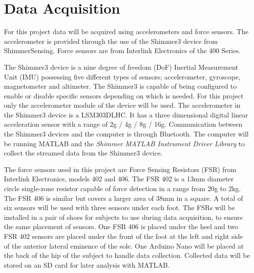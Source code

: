 \section{Data Acquisition}

For this project data will be acquired using accelerometers and force sensors. The accelerometer is provided through the use of the Shimmer3 device from ShimmerSensing. Force sensors are from Interlink Electronics of the 400 Series. %

The Shimmer3 device is a nine degree of freedom (DoF) Inertial Measurement Unit (IMU) possessing five different types of sensors; accelerometer, gyroscope, magnetometer and altimeter. The Shimmer3 is capable of being configured to enable or disable specific sensors depending on which is needed. For this project only the accelerometer module of the device will be used. The accelerometer in the Shimmer3 device is a LSM303DLHC. It has a three dimensional digital linear acceleration sensor with a range of \pm2g / \pm4g / \pm8g / \pm16g. \cite{LSM303DLHC} %
Communication between the Shimmer3 devices and the computer is through Bluetooth. The computer will be running MATLAB and the \textit{Shimmer MATLAB Instrument Driver Library} to collect the streamed data from the Shimmer3 device. 

The force sensors used in this project are Force Sensing Resistors (FSR) from Interlink Electronics, models 402 and 406. The FSR 402 is a 13mm diameter circle single-zone resistor capable of force detection in a range from 20g to 2kg. The FSR 406 is similar but covers a larger area of 38mm in a square. \cite{IE400}
A total of six sensors will be used with three sensors under each foot. The FSRs will be installed in a pair of shoes for subjects to use during data acquisition, to ensure the same placement of sensors. One FSR 406 is placed under the heel and two FSR 402 sensors are placed under the front of the foot at the left and right side of the anterior lateral eminence of the sole. One Arduino Nano will be placed at the back of the hip of the subject to handle data collection. Collected data will be stored on an SD card for later analysis with MATLAB. 


